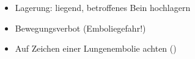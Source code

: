 
\begin{itemize}
  \item Lagerung:  liegend, betroffenes Bein hochlagern
  \item Bewegungsverbot (Emboliegefahr!)
  \item Auf Zeichen einer Lungenembolie achten ()
\end{itemize}